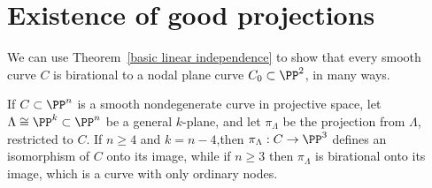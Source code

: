 \section{Existence of good projections}\label{projection section}\label{good projections}

We can use Theorem~\ref{basic linear independence} to show that every smooth curve $C$ is birational to a nodal plane curve $C_0 \subset \PP^2$, in many ways.

\begin{proposition}\label{nodal projection}
If $C \subset \PP^n$ is a smooth nondegenerate curve in projective space, let $\Lambda \cong \PP^{k} \subset \PP^n$ be a general $k$-plane, and let
$\pi_\Lambda$ be the projection from $\Lambda$, restricted to $C$. If $n\geq 4$ and $k=n-4$,then
$\pi_\Lambda: C \to \PP^3$ defines an isomorphism of $C$ onto its image, while if $n\geq 3$ then $\pi_\Lambda$ is birational onto its image, which is a curve with only ordinary nodes.
\end{proposition}

